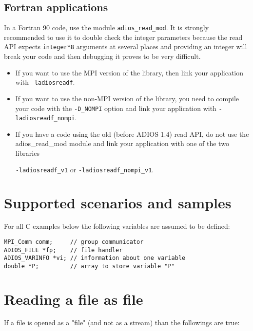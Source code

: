 \subsection{Fortran applications}

In a Fortran 90 code,  use the module 
\verb+adios_read_mod+. It is strongly recommended to use it to double check the integer 
parameters because the read API expects \verb+integer*8+ arguments 
at several places and providing an integer will break your code and then debugging 
it proves to be very difficult.

\begin{itemize}
\item If you want to use the MPI version of the library, then link your  application with \verb+-ladiosreadf+.

\item If you want to use the non-MPI version of the library, you need to compile your 
code with the \verb+-D_NOMPI+ option and link your application with \verb+-ladiosreadf_nompi+.

\item If you have a code using the old (before ADIOS 1.4) read API,  
do not use the adios\_read\_mod module and link your application 
with one of the two libraries 

\verb+-ladiosreadf_v1+ or \verb+-ladiosreadf_nompi_v1+.

\end{itemize}




\section{Supported scenarios and samples}

For all C examples below the following variables are assumed to be defined:
\begin{lstlisting}[frame=none]
MPI_Comm comm;     // group communicator
ADIOS_FILE *fp;    // file handler
ADIOS_VARINFO *vi; // information about one variable
double *P;         // array to store variable "P"
\end{lstlisting}


\section{Reading a file as file}
If a file is opened as a "file" (and not as a stream) than the followings are true:

